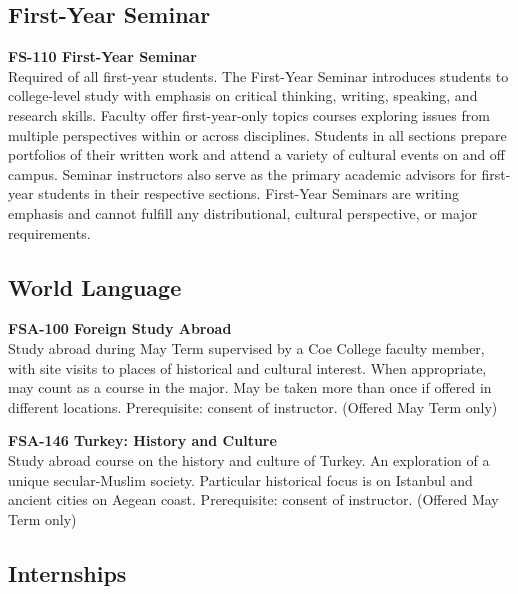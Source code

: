 \documentclass[
  letterpaper,
]{scrbook}
\begin{document}
\subsection{First-Year Seminar}\label{first-year-seminar}

\textbf{FS-110 First-Year Seminar}\\
Required of all first-year students. The First-Year Seminar introduces
students to college-level study with emphasis on critical thinking,
writing, speaking, and research skills. Faculty offer first-year-only
topics courses exploring issues from multiple perspectives within or
across disciplines. Students in all sections prepare portfolios of their
written work and attend a variety of cultural events on and off campus.
Seminar instructors also serve as the primary academic advisors for
first-year students in their respective sections. First-Year Seminars
are writing emphasis and cannot fulfill any distributional, cultural
perspective, or major requirements.

\subsection{World Language}\label{world-language}

\textbf{FSA-100 Foreign Study Abroad}\\
Study abroad during May Term supervised by a Coe College faculty member,
with site visits to places of historical and cultural interest. When
appropriate, may count as a course in the major. May be taken more than
once if offered in different locations. Prerequisite: consent of
instructor. (Offered May Term only)

\textbf{FSA-146 Turkey: History and Culture}\\
Study abroad course on the history and culture of Turkey. An exploration
of a unique secular-Muslim society. Particular historical focus is on
Istanbul and ancient cities on Aegean coast. Prerequisite: consent of
instructor. (Offered May Term only)

\subsection{Internships}\label{internships}
\end{document}
